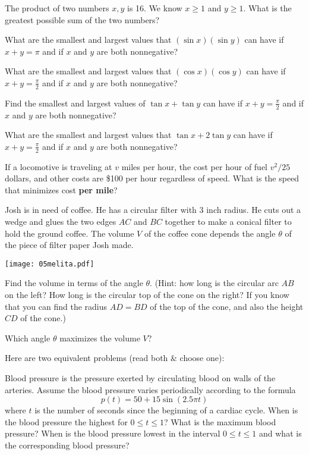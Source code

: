 \begin{multicols}{2}
\problem The product of two numbers $x, y$ is 16. We know $x\geq 1$ and $y %
\geq1$. What is the greatest possible sum of the two numbers?


\problem What are the smallest and largest values that $(\sin x)(\sin y)$ can %
have if  $x+y=\pi$ and if $x$ and $y$ are both nonnegative?


\problem What are the smallest and largest values that $(\cos x)(\cos y)$ can %
have if  $x+y=\frac\pi2$ and if $x$ and $y$ are both nonnegative?


\problem %
\subprob  Find the smallest and largest values of $\tan x
+ \tan y$ can have if $x+y=\frac\pi2$ and if $x$ and $y$ are both
nonnegative?




\subprob
What are the smallest and largest values that $\tan x + 2\tan y$ can
have if  $x+y=\frac\pi2$ and if $x$ and $y$ are both nonnegative?





\problem If a locomotive is traveling at $v$ miles per hour, the cost per hour %
of fuel $v^2 /25$ dollars, and other costs are \$100 per hour regardless of
speed. What is the speed that minimizes cost \textbf{per mile}?

\problem \groupproblem Josh is in need of coffee.  He has a circular filter with %
3 inch radius.  He cuts out a wedge and glues the two edges $AC$ and $BC$
together to make a conical filter to hold the ground coffee.  The volume $V$ of
the coffee cone depends the angle $\theta$ of the piece of filter paper Josh
made.

\centerline{\texttt{[image: 05melita.pdf]}}

\subprob  Find the volume in terms of the angle $\theta$.  (Hint:
how long is the  circular arc $AB$ on the left?  How long is the
circular top of the cone on the right?  If you know that you can find
the radius $AD=BD$ of the top of the cone, and also the height $CD$ of
the cone.)

\subprob Which angle $\theta$ maximizes the volume $V$?

\problem  Here are two equivalent problems (read both \& choose one): %

\subprob Blood pressure is the pressure exerted by circulating blood on
walls of the arteries. Assume the blood pressure varies periodically
according to the formula
\[
  p(t) = 50 +15\sin(2.5\pi t)
\]
where $t$ is the number of seconds since the beginning of a cardiac
cycle. When is the blood pressure the highest for $0 \leq t \leq 1$? What
is the maximum blood pressure? When is the blood pressure lowest in the
interval $0 \leq t \leq 1$ and what is the corresponding blood pressure?


\end{multicols}
